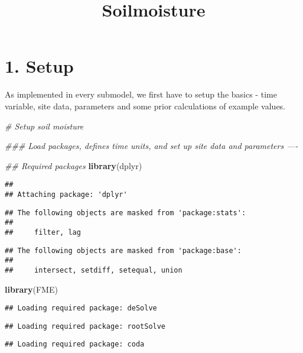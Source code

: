 \documentclass[
]{article}
\title{Soilmoisture}
\author{}
\date{\vspace{-2.5em}}
\newenvironment{Shaded}{\begin{snugshade}}{\end{snugshade}}
\newcommand{\CommentTok}[1]{\textcolor[rgb]{0.56,0.35,0.01}{\textit{#1}}}
\newcommand{\KeywordTok}[1]{\textcolor[rgb]{0.13,0.29,0.53}{\textbf{#1}}}
\newcommand{\NormalTok}[1]{#1}
\begin{document}
\maketitle

\hypertarget{setup}{%
\section{1. Setup}\label{setup}}

As implemented in every submodel, we first have to setup the basics -
time variable, site data, parameters and some prior calculations of
example values.

\begin{Shaded}
\begin{Highlighting}[]
\CommentTok{# Setup soil moisture }

\CommentTok{### Load packages, defines time units, and set up site data and parameters ----}

\CommentTok{## Required packages}
\KeywordTok{library}\NormalTok{(dplyr)}
\end{Highlighting}
\end{Shaded}

\begin{verbatim}
## 
## Attaching package: 'dplyr'
\end{verbatim}

\begin{verbatim}
## The following objects are masked from 'package:stats':
## 
##     filter, lag
\end{verbatim}

\begin{verbatim}
## The following objects are masked from 'package:base':
## 
##     intersect, setdiff, setequal, union
\end{verbatim}

\begin{Shaded}
\begin{Highlighting}[]
\KeywordTok{library}\NormalTok{(FME)}
\end{Highlighting}
\end{Shaded}

\begin{verbatim}
## Loading required package: deSolve
\end{verbatim}

\begin{verbatim}
## Loading required package: rootSolve
\end{verbatim}

\begin{verbatim}
## Loading required package: coda
\end{verbatim}
\end{document}
